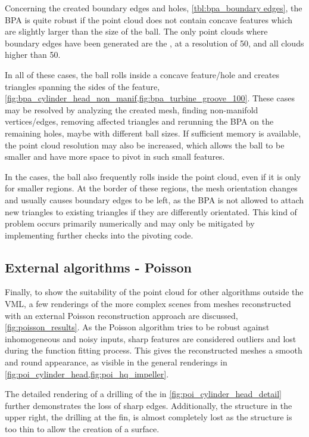 Concerning the created boundary edges and holes, \cf \cref{tbl:bpa_boundary edges}, the BPA is quite robust if the point cloud does not contain concave features which are slightly larger than the size of the ball.
The only point clouds where boundary edges have been generated are the \cylinderhead, at a resolution of 50, and all \turbine clouds higher than 50.

In all of these cases, the ball rolls inside a concave feature/hole and creates triangles spanning the sides of the feature, \cf \cref{fig:bpa_cylinder_head_non_manif,fig:bpa_turbine_groove_100}.
These cases may be resolved by analyzing the created mesh, finding non-manifold vertices/edges, removing affected triangles and rerunning the BPA on the remaining holes, maybe with different ball sizes.
If sufficient memory is available, the point cloud resolution may also be increased, which allows the ball to be smaller and have more space to pivot in such small features.

In the \turbine cases, the ball also frequently rolls inside the point cloud, even if it is only for smaller regions.
At the border of these regions, the mesh orientation changes and usually causes boundary edges to be left, as the BPA is not allowed to attach new triangles to existing triangles if they are differently orientated.
This kind of problem occurs primarily numerically and may only be mitigated by implementing further checks into the pivoting code.


\subsection{External algorithms - Poisson}

Finally, to show the suitability of the point cloud for other algorithms outside the VML, a few renderings of the more complex scenes from meshes reconstructed with an external Poisson reconstruction approach are discussed, \cf \cref{fig:poisson_results}.
As the Poisson algorithm tries to be robust against inhomogeneous and noisy inputs, sharp features are considered outliers and lost during the function fitting process.
This gives the reconstructed meshes a smooth and round appearance, as visible in the general renderings in \cref{fig:poi_cylinder_head,fig:poi_hq_impeller}.

The detailed rendering of a drilling of the \cylinderhead in \cref{fig:poi_cylinder_head_detail} further demonstrates the loss of sharp edges.
Additionally, the structure in the upper right, the drilling at the fin, is almost completely lost as the structure is too thin to allow the creation of a surface.

